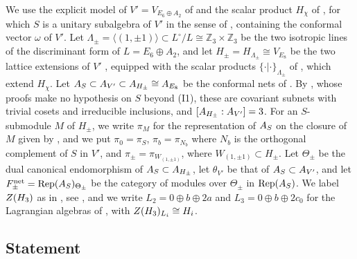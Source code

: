 \documentclass[leqno]{article}
\let\cal\relax
\newcommand{\cal}{\mathcal}
\newcommand{\Z}{\ensuremath{\mathbb{Z}}}
\newcommand{\la}{\langle}
\newcommand{\ra}{\rangle}
\DeclareMathOperator{\Rep}{Rep}
\numberwithin{equation}{section}
\begin{document}
We use the explicit model of $V' = V_{E_6 \oplus A_2}$ of \cite[Section 10.1]{Arh26} and the scalar product $H_\chi$ of \cite[Theorem 10.10]{Arh26}, for which $S$ is a unitary subalgebra of $V'$ in the sense of \cite[Definition 5.22]{CKLW18}, containing the conformal vector $\omega$ of $V'$. Let $\Lambda_\pm = \la(1,\pm1)\ra \subset L^\circ/L \cong \Z_3 \times \Z_3$ be the two isotropic lines of the discriminant form of $L = E_6 \oplus A_2$, and let $H_\pm = H_{\Lambda_\pm} \cong V_{E_8}$ be the two lattice extensions of $V'$ \cite[Lemma 4.1]{ArhII}, equipped with the scalar products $\{\cdot|\cdot\}_{\Lambda_\pm}$ of \cite[Lemma 4.2]{ArhII}, which extend $H_\chi$. Let $\cal A_S \subset \cal A_{V'} \subset \cal A_{H_\pm} \cong \cal A_{E_8}$ be the conformal nets of \cite{CKLW18}. By \cite[Theorem 4.5 and Proposition 4.3]{ArhII}, whose proofs make no hypothesis on $S$ beyond (I1), these are covariant subnets with trivial cosets and irreducible inclusions, and $[\cal A_{H_\pm} : \cal A_{V'}] = 3$. For an $S$-submodule $M$ of $H_\pm$, we write $\pi_M$ for the representation of $\cal A_S$ on the closure of $M$ given by \cite[Lemma 4.7]{ArhII}, and we put $\pi_0 = \pi_S$, $\pi_b = \pi_{N_b}$ where $N_b$ is the orthogonal complement of $S$ in $V'$, and $\pi_\pm = \pi_{W_{(1,\pm1)}}$, where $W_{(1,\pm1)} \subset H_\pm$. Let $\Theta_\pm$ be the dual canonical endomorphism of $\cal A_S \subset \cal A_{H_\pm}$, let $\theta_{V'}$ be that of $\cal A_S \subset \cal A_{V'}$, and let $\cal F^{\mathrm{net}}_\pm = \Rep(\cal A_S)_{\Theta_\pm}$ be the category of modules over $\Theta_\pm$ in $\Rep(\cal A_S)$. We label $Z(\cal H_3)$ as in \cite{EvG11}, see \cite[Section 2.2]{ArhII}, and we write $L_2 = 0 \oplus b \oplus 2a$ and $L_3 = 0 \oplus b \oplus 2c_0$ for the Lagrangian algebras of \cite[Proposition 3.3 and Corollary 3.8]{ArhII}, with $Z(\cal H_3)_{L_i} \cong \cal H_i$.


\subsection{Statement}
\end{document}
